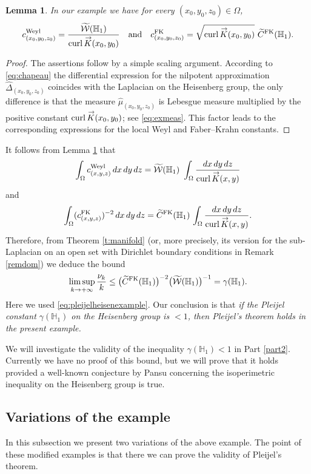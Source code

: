\documentclass[10pt]{amsart}
\newcommand{\FK}{\textup{FK}}
\newcommand{\Weyl}{\textup{Weyl}}
\renewcommand{\vec}[1]
{\overset{\,{\raisebox{-2pt}{$\scriptstyle\to$}}}{#1}}
\newtheorem{lemma}[theorem]{Lemma}
\theoremstyle{definition}
\newcommand{\1}{\mathbbm{1}}
\begin{document}
\begin{lemma}\label{exampleconst}
In our example we have for every $(x_0,y_0,z_0)\in\Omega$,
\[
c^\Weyl_{(x_0,y_0,z_0)} = \frac{\widetilde{\mathcal W}(\mathbb H_1)}{\mathrm{curl}\,\vec{K}(x_0,y_0)}
\quad\text{and}\quad
c_{(x_0,y_0,z_0)}^\FK = \sqrt{\mathrm{curl}\,\vec{K}(x_0,y_0)} \ \widetilde C^\FK(\mathbb H_1).
\]
\end{lemma}

\begin{proof}
The assertions follow by a simple scaling argument. According to \eqref{eq:chapeau} the differential expression for the nilpotent approximation $\widehat\Delta_{(x_0,y_0,z_0)}$ coincides with the Laplacian on the Heisenberg group, the only difference is that the measure $\widehat\mu_{(x_0,y_0,z_0)}$ is Lebesgue measure multiplied by the positive constant $\mathrm{curl}\,\vec{K}(x_0,y_0)$; see \eqref{eq:exmeas}. This factor leads to the corresponding expressions for the local Weyl and Faber--Krahn constants.
\end{proof}

It follows from Lemma \ref{exampleconst} that
\[
\int_\Omega c^\Weyl_{(x,y,z)} \,dx\,dy\,dz = \widetilde{\mathcal W}(\mathbb H_1) \ \int_\Omega \frac{dx\,dy\,dz}{\text{curl}\,\vec{K}(x,y)}
\]
and
\[
\int_\Omega (c_{(x,y,z)}^\FK)^{-2} \,dx\,dy\,dz = \widetilde C^\FK(\mathbb H_1) \,\int_\Omega \frac{dx\,dy\,dz}{\text{curl}\,\vec{K}(x,y)}.
\]
Therefore, from Theorem \ref{t:manifold} (or, more precisely, its version for the sub-Laplacian on an open set with Dirichlet boundary conditions in Remark \ref{remdom}) we deduce the bound
\[
\limsup_{k\to+\infty} \frac{\nu_k}{k} \leq \bigl(\widetilde C^\FK(\mathbb H_1)\bigr)^{-2} \bigl(\widetilde{\mathcal W}(\mathbb H_1)\bigr)^{-1} = \gamma(\mathbb H_1).
\]
Here we used \eqref{eq:pleijelheisenexample}. Our conclusion is that \emph{if the Pleijel constant $\gamma(\mathbb H_1)$ on the Heisenberg group is $<1$, then Pleijel's theorem holds in the present example.}

We will investigate the validity of the inequality $\gamma(\mathbb H_1)<1$ in Part \ref{part2}. Currently we have no proof of this bound, but we will prove that it holds provided a well-known conjecture by Pansu concerning the isoperimetric inequality on the Heisenberg group is true.

\subsection{Variations of the example}
In this subsection we present two variations of the above example. The point of these modified examples is that there we can prove the validity of Pleijel's theorem.
\end{document}
